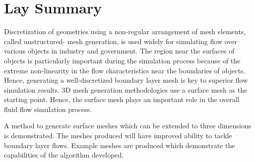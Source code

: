 

\chapter{Lay Summary}

Discretization of geometries using a non-regular arrangement of mesh elements, called unstructured- mesh generation, is used widely for simulating flow over various objects in industry and government. The region near the surfaces of objects is particularly important during the simulation process because of the extreme non-linearity in the flow characteristics near the boundaries of objects. Hence, generating a well-discretized boundary layer mesh is key to superior flow simulation results. 3D mesh generation methodologies use a surface mesh as the starting point. Hence, the surface mesh plays an important role in the overall fluid flow simulation process.

A method to generate surface meshes which can be extended to three dimensions is demonstrated. The meshes produced will have improved ability to tackle boundary layer flows. Example meshes are produced which demonstrate the capabilities of the algorithm developed.

